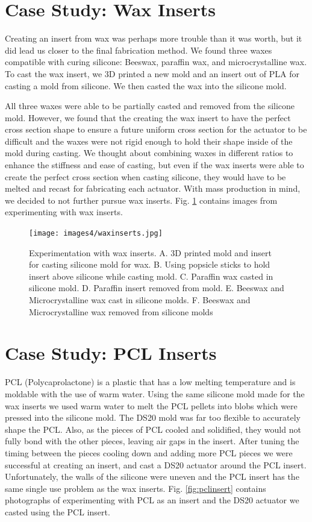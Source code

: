 \section{Case Study: Wax Inserts}
Creating an insert from wax was perhaps more trouble than it was worth, but it did lead us closer to the final fabrication method. We found three waxes compatible with curing silicone: Beeswax, paraffin wax, and microcrystalline wax. To cast the wax insert, we 3D printed a new mold and an insert out of PLA for casting a mold from silicone. We then casted the wax into the silicone mold. 

All three waxes were able to be partially casted and removed from the silicone mold. However, we found that the creating the wax insert to have the perfect cross section shape to ensure a future uniform cross section for the actuator to be difficult and the waxes were not rigid enough to hold their shape inside of the mold during casting. We thought about combining waxes in different ratios to enhance the stiffness and ease of casting, but even if the wax inserts were able to create the perfect cross section when casting silicone, they would have to be melted and recast for fabricating each actuator. With mass production in mind, we decided to not further pursue wax inserts. Fig. \ref{fig:waxinserts} contains images from experimenting with wax inserts. 

\begin{figure}[h]
    \centering
    \texttt{[image: images4/waxinserts.jpg]}
    \caption{Experimentation with wax inserts. A. 3D printed mold and insert for casting silicone mold for wax. B. Using popsicle sticks to hold insert above silicone while casting mold. C. Paraffin wax casted in silicone mold. D. Paraffin insert removed from mold. E. Beeswax and Microcrystalline wax cast in silicone molds. F. Beeswax and Microcrystalline wax removed from silicone molds}
    \label{fig:waxinserts}
\end{figure}

\section{Case Study: PCL Inserts}

PCL (Polycaprolactone) is a plastic that has a low melting temperature and is moldable with the use of warm water. Using the same silicone mold made for the wax inserts we used warm water to melt the PCL pellets into blobs which were pressed into the silicone mold. The DS20 mold was far too flexible to accurately shape the PCL. Also, as the pieces of PCL cooled and solidified, they would not fully bond with the other pieces, leaving air gaps in the insert. After tuning the timing between the pieces cooling down and adding more PCL pieces we were successful at creating an insert, and cast a DS20 actuator around the PCL insert. Unfortunately, the walls of the silicone were uneven and the PCL insert has the same single use problem as the wax inserts. Fig. \ref{fig:pclinsert} contains photographs of experimenting with PCL as an insert and the DS20 actuator we casted using the PCL insert. 

